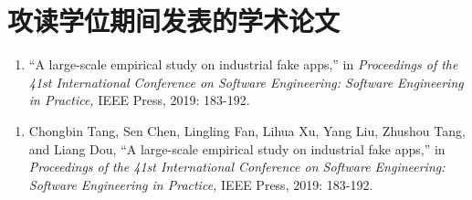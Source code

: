 \chapter*{攻读学位期间发表的学术论文}


\ifdefined \anonymous
	\begin{enumerate}
		\item ``A large-scale empirical study on industrial fake apps,'' in \textit{Proceedings of the 41st International Conference on Software Engineering: Software Engineering in Practice,} IEEE Press, 2019: 183-192. 
	\end{enumerate}
\else
	\begin{enumerate}
		\item Chongbin Tang, Sen Chen, Lingling Fan, Lihua Xu, Yang Liu, Zhushou Tang, and Liang Dou, ``A large-scale empirical study on industrial fake apps,'' in \textit{Proceedings of the 41st International Conference on Software Engineering: Software Engineering in Practice,} IEEE Press, 2019: 183-192. 
	\end{enumerate}
\fi
